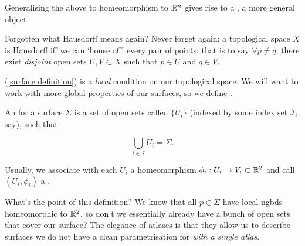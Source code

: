 \documentclass[11pt]{scrartcl}
\begin{document}
\begin{remark}
Generalising the above to homeomorphism to $\mathbb R^n$ gives rise to a , a more general object.
\end{remark}

\begin{remark}
Forgotten what Hausdorff means again? Never forget again: a topological space $X$ is Hausdorff iff we can `house off' every pair of points: that is to say $\forall p \neq q$, there exist \textit{disjoint} open sets $U, V \subset X$ such that $p \in U$ and $q \in V$.
\end{remark}

(\ref{surface definition}) is a \textit{local} condition on our topological space. We will want to work with more global properties of our surfaces, so we define .

\begin{definition}
An  for a surface $\Sigma$ is a set of open sets called  $\{ U_i \}$ (indexed by some index set $\mathcal{I}$, say), such that 

\begin{equation}
    \bigcup_{i \in \mathcal{I}} U_i = \Sigma.
\end{equation}

Usually, we associate with each $U_i$ a homeomorphism $\phi_i : U_i \rightarrow V_i \subset \mathbb R^2$ and call $(U_i, \phi_i)$ a .
\end{definition}

What's the point of this definition? We know that all $p \in \Sigma$ have local ngbds homeomorphic to $\mathbb R^2$, so don't we essentially already have a bunch of open sets that cover our surface? The elegance of atlases is that they allow us to describe surfaces we do not have a clean parametrisation for \textit{with a single atlas}.
\end{document}
